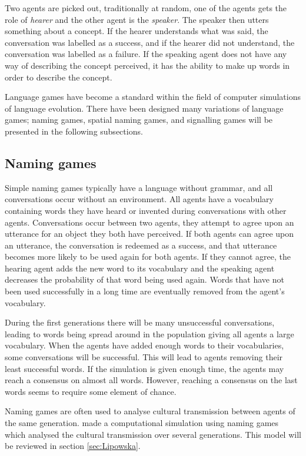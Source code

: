 Two agents are picked out, traditionally at random, one of the agents gets the role of \textit{hearer} and the other agent is the \textit{speaker}. The speaker then utters something about a concept. If the hearer understands what was said, the conversation was labelled as a success, and if the hearer did not understand, the conversation was labelled as a failure. If the speaking agent does not have any way of describing the concept perceived, it has the ability to make up words in order to describe the concept. 

Language games have become a standard within the field of computer simulations of language evolution. There have been designed many variations of language games; naming games, spatial naming games, and signalling games will be presented in the following subsections.

\subsection{Naming games}
Simple naming games typically have a language without grammar, and all conversations occur without an environment. All agents have a vocabulary containing words they have heard or invented during conversations with other agents. Conversations occur between two agents, they attempt to agree upon an utterance for an object they both have perceived. If both agents can agree upon an utterance, the conversation is redeemed as a success, and that utterance becomes more likely to be used again for both agents. If they cannot agree, the hearing agent adds the new word to its vocabulary and the speaking agent decreases the probability of that word being used again. Words that have not been used successfully in a long time are eventually removed from the agent's vocabulary.

During the first generations there will be many unsuccessful conversations, leading to words being spread around in the population giving all agents a large vocabulary. When the agents have added enough words to their vocabularies, some conversations will be successful. This will lead to agents removing their least successful words. If the simulation is given enough time, the agents may reach a consensus on almost all words. However, reaching a consensus on the last words seems to require some element of chance.

Naming games are often used to analyse cultural transmission between agents of the same generation. \citet{lipowska2011naming} made a computational simulation using naming games which analysed the cultural transmission over several generations. This model will be reviewed in section \ref{sec:Lipowska}.

